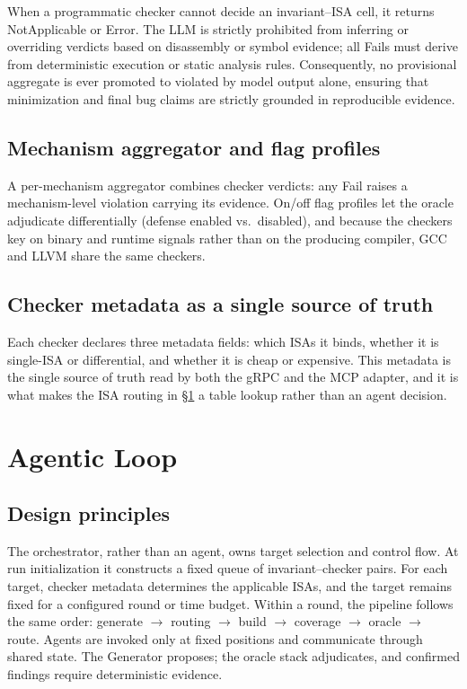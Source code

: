 \documentclass[conference]{IEEEtran}
\begin{document}
When a programmatic checker cannot decide an invariant--ISA cell, it returns
NotApplicable or Error. The LLM is strictly prohibited from inferring or
overriding verdicts based on disassembly or symbol evidence; all Fails must
derive from deterministic execution or static analysis rules. Consequently,
no provisional aggregate is ever promoted to violated by model output alone,
ensuring that minimization and final bug claims are strictly grounded in
reproducible evidence.

\subsection{Mechanism aggregator and flag profiles}
A per-mechanism aggregator combines checker verdicts: any Fail raises a
mechanism-level violation carrying its evidence. On/off flag profiles let the
oracle adjudicate differentially (defense enabled vs.\ disabled), and because the
checkers key on binary and runtime signals rather than on the producing
compiler, GCC and LLVM share the same checkers.

\subsection{Checker metadata as a single source of truth}
Each checker declares three metadata fields: which ISAs it binds, whether it is
single-ISA or differential, and whether it is cheap or expensive. This metadata
is the single source of truth read by both the gRPC and the MCP adapter, and it
is what makes the ISA routing in \S\ref{sec:loop} a table lookup rather than an
agent decision.

\section{Agentic Loop}\label{sec:loop}

\subsection{Design principles}
The orchestrator, rather than an agent, owns target selection and control flow.
At run initialization it constructs a fixed queue of invariant--checker pairs.
For each target, checker metadata determines the applicable ISAs, and the target
remains fixed for a configured round or time budget. Within a round, the
pipeline follows the same order: generate $\rightarrow$ routing $\rightarrow$
build $\rightarrow$ coverage $\rightarrow$ oracle $\rightarrow$ route. Agents
are invoked only at fixed positions and communicate through shared state. The
Generator proposes; the oracle stack adjudicates, and confirmed findings require
deterministic evidence.
\end{document}
